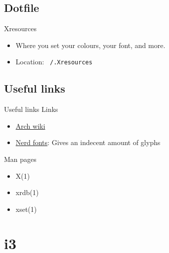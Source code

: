 \documentclass{beamer}
\begin{document}
\subsection*{Dotfile}
\begin{frame}{Xresources}
\begin{itemize}
  \item Where you set your colours, your font, and more.
  \item Location: \texttt{~/.Xresources}
\end{itemize}
\end{frame}

\subsection*{Useful links}
\begin{frame}{Useful links}
Links
\begin{itemize}
  \item \href{https://wiki.archlinux.org/index.php/X_resources}{Arch wiki}
  \item \href{https://github.com/ryanoasis/nerd-fonts}{Nerd fonts}: Gives an indecent amount of glyphs
\end{itemize}
Man pages
\begin{itemize}
  \item X(1)
  \item xrdb(1)
  \item xset(1)
\end{itemize}
\end{frame}


\section{i3}
\end{document}
